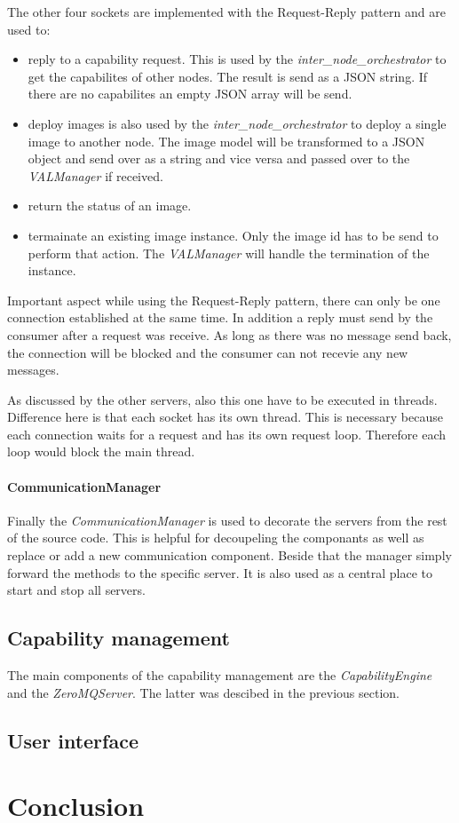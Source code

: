 The other four sockets are implemented with the Request-Reply pattern and are used to:
\begin{itemize}
  \item reply to a capability request.
  This is used by the \textit{inter\_node\_orchestrator} to get the capabilites of other nodes.
  The result is send as a \ac{JSON} string.
  If there are no capabilites an empty \ac{JSON} array will be send.
  \item deploy images is also used by the \textit{inter\_node\_orchestrator} to deploy a single image to another node.
  The image model will be transformed to a \ac{JSON} object and send over as a string and vice versa and passed over to the \textit{VALManager} if received.
  \item return the status of an image. 
  \item termainate an existing image instance.
  Only the image id has to be send to perform that action.
  The \textit{VALManager} will handle the termination of the instance.
\end{itemize}
Important aspect while using the Request-Reply pattern, there can only be one connection established at the same time.
In addition a reply must send by the consumer after a request was receive.
As long as there was no message send back, the connection will be blocked and the consumer can not recevie any new messages.

As discussed by the other servers, also this one have to be executed in threads.
Difference here is that each socket has its own thread.
This is necessary because each connection waits for a request and has its own request loop.
Therefore each loop would block the main thread.

\paragraph{CommunicationManager}
Finally the \textit{CommunicationManager} is used to decorate the servers from the rest of the source code.
This is helpful for decoupeling the componants as well as replace or add a new communication component.
Beside that the manager simply forward the methods to the specific server.
It is also used as a central place to start and stop all servers.

\subsection{Capability management}
The main components of the capability management are the \textit{CapabilityEngine} and the \textit{ZeroMQServer}.
The latter was descibed in the previous section.


\subsection{User interface}
\doit


\section{Conclusion}
\doit
